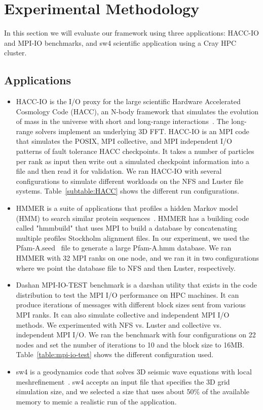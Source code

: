 \section{Experimental Methodology}\label{AA}
In this section we will evaluate our framework using three applications: HACC-IO and MPI-IO benchmarks, and sw4 scientific application using a Cray HPC cluster.

\subsection{Applications}
\begin{itemize}
	\item HACC-IO is the I/O proxy for the large scientific Hardware Accelerated Cosmology Code (HACC), an N-body framework that simulates the evolution of mass in the universe with short and long-range interactions~\cite{habib2013hacc}. The long-range solvers implement an underlying 3D FFT. HACC-IO is an MPI code that simulates the POSIX, MPI collective, and MPI independent I/O patterns of fault tolerance HACC checkpoints. It takes a number of particles per rank as input then write out a simulated checkpoint information into a file and then read it for validation. We ran HACC-IO with several configurations to simulate different workloads on the NFS and Luster file systems. Table~\ref{subtable:HACC} shows the different run configurations. 
	\item HMMER is a suite of applications that profiles a hidden Markov model (HMM) to search similar protein sequences~\cite{eddy1992hmmer}. HMMER has a building code called "hmmbuild" that uses MPI to build a database by concatenating multiple profiles Stockholm alignment files. In our experiment, we used the Pfam-A.seed~\cite{sonnhammer1998pfam} file to generate a large Pfam-A.hmm database. We ran HMMER with 32 MPI ranks on one node, and we ran it in two configurations where we point the database file to NFS and then Luster, respectively. 
	\item Dashan MPI-IO-TEST benchmark is a darshan utility that exists in the code distribution to test the MPI I/O performance on HPC machines. It can produce iterations of messages with different block sizes sent from various MPI ranks. It can also simulate collective and independent MPI I/O methods. We experimented with NFS vs. Luster and collective vs. independent MPI I/O. We ran the benchmark with four configurations on 22 nodes and set the number of iterations to 10 and the block size to 16MB. Table~\ref{table:mpi-io-test} shows the different configuration used.
	\item sw4 is a geodynamics code that solves 3D seismic wave equations with local meshrefinement~\cite{peterssonsw4}. sw4 accepts an input file that specifies the 3D grid simulation size, and we selected a size that uses about 50\% of the available memory to memic a realistic run of the application.
\end{itemize}

